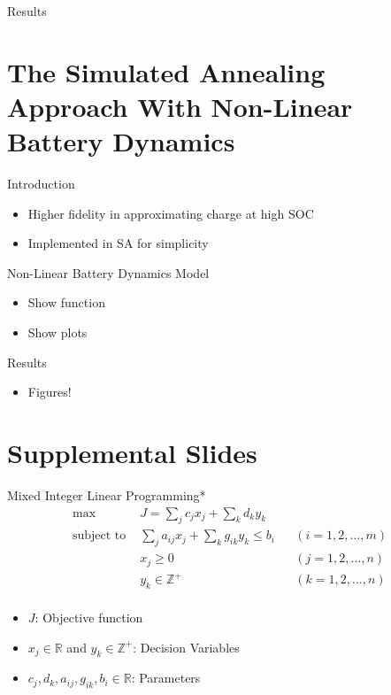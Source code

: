 \documentclass[aspectratio=169]{beamer}
\begin{document}
\begin{frame}[label={sec:org4ee59dd}]{Results}
\section{The Simulated Annealing Approach With Non-Linear Battery Dynamics}
\label{sec:orgae8c976}
\begin{frame}[label={sec:org9979c1c}]{Introduction}
\begin{itemize}
\item Higher fidelity in approximating charge at high SOC
\item Implemented in SA for simplicity
\end{itemize}
\end{frame}
\begin{frame}[label={sec:orgb0a69c1}]{Non-Linear Battery Dynamics Model}
\begin{itemize}
\item Show function
\item Show plots
\end{itemize}
\end{frame}
\begin{frame}[label={sec:org8991cbb}]{Results}
\begin{itemize}
\item Figures!
\end{itemize}
\end{frame}

\section{Supplemental Slides}
\label{sec:orgaa19478}
\begin{frame}[label={sec:org00ff72f}]{Mixed Integer Linear Programming*}
\begin{align*}
\text{max }        &J = \sum_j c_j x_j + \sum_k d_k y_k&         &               \\
\text{subject to } &\sum_j a_{ij} x_j + \sum_k g_{ik} y_k \le b_i&  &(i = 1,2,...,m)\\
                  &x_j \ge 0&                              &(j = 1,2,...,n)\\
                  &y_k \in \mathbb{Z^+}&                   &(k = 1,2,...,n)\\
\end{align*}

\begin{itemize}
\item \(J\): Objective function
\item \(x_j \in \mathbb{R}\) and \(y_k \in \mathbb{Z}^+\): Decision Variables
\item \(c_j, d_k, a_{ij}, g_{ik}, b_i \in \mathbb{R}\): Parameters
\end{itemize}
\end{frame}



\end{frame}
\end{document}
